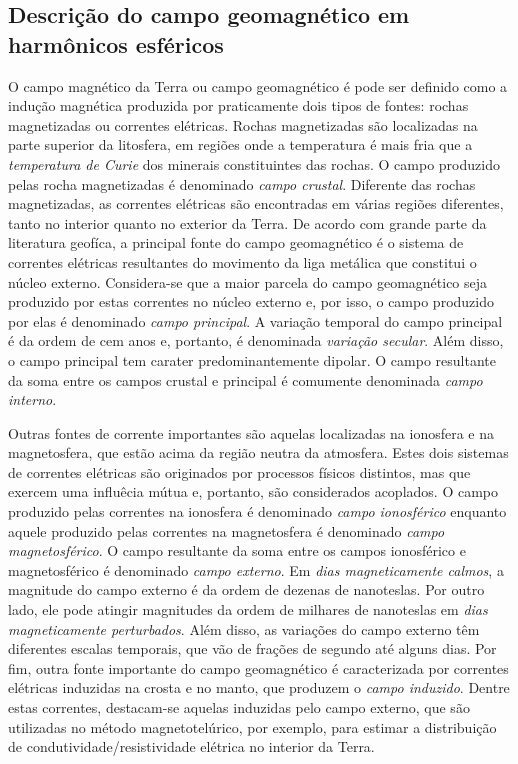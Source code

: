 \documentclass[10pt,a4paper,fleqn]{article}
\begin{document}
\subsection{Descri\c{c}\~{a}o do campo geomagn\'{e}tico em harm\^{o}nicos esf\'{e}ricos}

O campo magn\'{e}tico da Terra ou campo geomagn\'{e}tico \'{e} pode ser definido
como a indu\c{c}\~{a}o magn\'{e}tica produzida por praticamente dois tipos de
fontes: rochas magnetizadas ou correntes el\'{e}tricas.
Rochas magnetizadas s\~{a}o localizadas na parte superior da litosfera,
em regi\~{o}es onde a temperatura \'{e} mais fria que a \textit{temperatura
de Curie} dos minerais constituintes das rochas.
O campo produzido pelas rocha magnetizadas \'{e} denominado \textit{campo
crustal}.
Diferente das rochas magnetizadas, as correntes el\'{e}tricas s\~{a}o 
encontradas em v\'{a}rias regi\~{o}es diferentes, tanto no interior 
quanto no exterior da Terra.
De acordo com grande parte da literatura geof\'{i}ca, a principal fonte 
do campo geomagn\'{e}tico \'{e} o sistema de correntes el\'{e}tricas 
resultantes do movimento da liga met\'{a}lica que constitui o n\'{u}cleo externo.
Considera-se que a maior parcela do campo geomagn\'{e}tico seja produzido
por estas correntes no n\'{u}cleo externo e, por isso, o campo produzido
por elas \'{e} denominado \textit{campo principal}.
A varia\c{c}\~{a}o temporal do campo principal \'{e} da ordem
de cem anos e, portanto, \'{e} denominada \textit{varia\c{c}\~{a}o
secular}.
Al\'{e}m disso, o campo principal tem carater predominantemente dipolar.
O campo resultante da soma entre os campos crustal e principal \'{e}
comumente denominada \textit{campo interno}.

Outras fontes de corrente importantes s\~{a}o aquelas localizadas
na ionosfera e na magnetosfera, que est\~{a}o acima da regi\~{a}o 
neutra da atmosfera.
Estes dois sistemas de correntes el\'{e}tricas s\~{a}o originados
por processos f\'{i}sicos distintos, mas que exercem uma influ\^{e}cia
m\'{u}tua e, portanto, s\~{a}o considerados acoplados.
O campo produzido pelas correntes na ionosfera \'{e} denominado
\textit{campo ionosf\'{e}rico} enquanto aquele produzido pelas 
correntes na magnetosfera \'{e} denominado \textit{campo 
magnetosf\'{e}rico}.
O campo resultante da soma entre os campos ionosf\'{e}rico e 
magnetosf\'{e}rico \'{e} denominado \textit{campo externo}.
Em \textit{dias magneticamente calmos}, a magnitude do campo
externo \'{e} da ordem de dezenas de nanoteslas.
Por outro lado, ele pode atingir magnitudes da ordem de milhares
de nanoteslas em \textit{dias magneticamente perturbados}.
Al\'{e}m disso, as varia\c{c}\~{o}es do campo externo t\^{e}m 
diferentes escalas temporais, que v\~{a}o de fra\c{c}\~{o}es 
de segundo at\'{e} alguns dias.
Por fim, outra fonte importante do campo geomagn\'{e}tico \'{e} 
caracterizada por correntes el\'{e}tricas induzidas na crosta e no
manto, que produzem o \textit{campo induzido}. Dentre estas
correntes, destacam-se aquelas induzidas pelo campo externo,
que s\~{a}o utilizadas no m\'{e}todo magnetotel\'{u}rico, por 
exemplo, para estimar a distribui\c{c}\~{a}o de 
condutividade/resistividade el\'{e}trica no interior da Terra.
\end{document}
